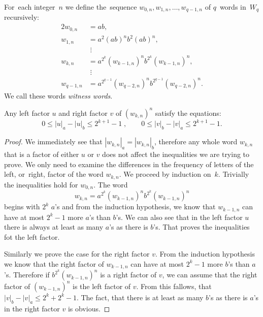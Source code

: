 \begin{defn}
    For~each integer~$n$ we define the~sequence $w_{0,n}, w_{1,n}, \dotsc , w_{q-1,n}$ of $q$~words in~$W_q$ recursively:
    \begin{alignat*}{2}
        w_{0,n} &= ab,\\
        w_{1,n} &= a^2{(ab)}^{n}b^2{(ab)}^{n},\\
                &\; \vdots \\
        w_{k,n} &= a^{2^k}{(w_{k-1,n})}^{n}b^{2^k}{(w_{k-1,n})}^{n},\\
                &\; \vdots \\
        w_{q-1,n} &= a^{2^{q-1}}{(w_{q-2,n})}^{n}b^{2^{q-1}}{(w_{q-2,n})}^{n}.
    \end{alignat*}
    We call these words \emph{witness words}.
\end{defn}

\begin{lemma}\label{lm:witness_words_inequalities}
    Any left factor $u$ and right factor $v$ of ${(w_{k,n})}^n$ satisfy the equations:
    \begin{equation}
        0 \leq |u|_a - |u|_b \leq 2^{k+1}-1 \; , \qquad 0 \leq |v|_b - |v|_a \leq 2^{k+1}-1.
    \end{equation}
\end{lemma}

\begin{proof}
    We immediately see that $|w_{k,n}|_a = |w_{k,n}|_b$, therefore any whole word $w_{k,n}$ that is a factor of either $u$ or $v$ does not affect the inequalities we are trying to prove. We only need to examine the differences in the frequency of letters of the left, or~right, factor of the word $w_{k,n}$. We proceed by induction on~$k$. Trivially the inequalities hold for $w_{0,n}$. The word
    \[
        w_{k,n} = a^{2^k}{(w_{k-1,n})}^{n}b^{2^k}{(w_{k-1,n})}^{n}
    \] begins with $2^k$ $a$'s and from the induction hypothesis, we know that $w_{k-1,n}$ can have at most $2^k-1$ more $a$'s than $b$'s. We can also see that in the left factor $u$ there is always at least as many $a$'s as there is $b$'s. That proves the inequalities fot the left factor.

    Similarly we prove the case for the right factor $v$. From the induction hypothesis we know that the right factor of $w_{k-1,n}$ can have at most $2^k-1$ more $b$'s than $a$'s. Therefore if $b^{2^k}{(w_{k-1,n})}^{n}$ is a right factor of $v$, we can assume that the right factor of ${(w_{k-1,n})}^{n}$ is the left factor of $v$. From this fallows, that $|v|_b - |v|_a \leq 2^k + 2^k -1$. The fact, that there is at least as many $b$'s as there is $a$'s in the right factor $v$ is obvious.
\end{proof}

